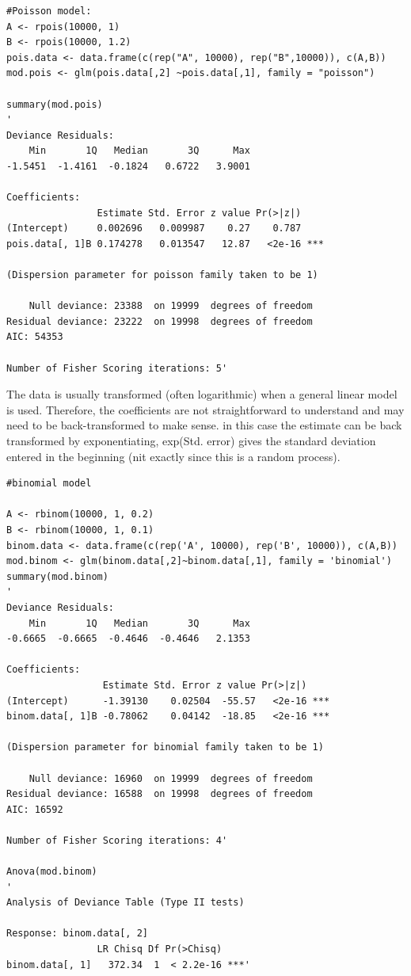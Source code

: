 \documentclass{article}
\begin{document}
\begin{lstlisting}
#Poisson model:
A <- rpois(10000, 1)
B <- rpois(10000, 1.2) 
pois.data <- data.frame(c(rep("A", 10000), rep("B",10000)), c(A,B))
mod.pois <- glm(pois.data[,2] ~pois.data[,1], family = "poisson")

summary(mod.pois)
'
Deviance Residuals: 
    Min       1Q   Median       3Q      Max  
-1.5451  -1.4161  -0.1824   0.6722   3.9001  

Coefficients:
                Estimate Std. Error z value Pr(>|z|)    
(Intercept)     0.002696   0.009987    0.27    0.787    
pois.data[, 1]B 0.174278   0.013547   12.87   <2e-16 ***

(Dispersion parameter for poisson family taken to be 1)

    Null deviance: 23388  on 19999  degrees of freedom
Residual deviance: 23222  on 19998  degrees of freedom
AIC: 54353

Number of Fisher Scoring iterations: 5'
\end{lstlisting}

The data is usually transformed (often logarithmic) when a general linear model is used. Therefore, the coefficients are not straightforward to understand and may need to be back-transformed to make sense. in this case the estimate can be back transformed by exponentiating, exp(Std. error) gives the standard deviation entered in the beginning (nit exactly since this is a random process).

\begin{lstlisting}
#binomial model

A <- rbinom(10000, 1, 0.2)
B <- rbinom(10000, 1, 0.1)
binom.data <- data.frame(c(rep('A', 10000), rep('B', 10000)), c(A,B))
mod.binom <- glm(binom.data[,2]~binom.data[,1], family = 'binomial')
summary(mod.binom)
'
Deviance Residuals: 
    Min       1Q   Median       3Q      Max  
-0.6665  -0.6665  -0.4646  -0.4646   2.1353  

Coefficients:
                 Estimate Std. Error z value Pr(>|z|)    
(Intercept)      -1.39130    0.02504  -55.57   <2e-16 ***
binom.data[, 1]B -0.78062    0.04142  -18.85   <2e-16 ***

(Dispersion parameter for binomial family taken to be 1)

    Null deviance: 16960  on 19999  degrees of freedom
Residual deviance: 16588  on 19998  degrees of freedom
AIC: 16592

Number of Fisher Scoring iterations: 4'

Anova(mod.binom)
'
Analysis of Deviance Table (Type II tests)

Response: binom.data[, 2]
                LR Chisq Df Pr(>Chisq)    
binom.data[, 1]   372.34  1  < 2.2e-16 ***'

\end{lstlisting}
\end{document}
